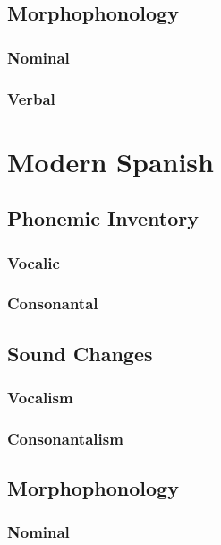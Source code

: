\documentclass{report}
\begin{document}
\section{Morphophonology}

\subsection{Nominal}

\subsection{Verbal}

\chapter{Modern Spanish}


\section{Phonemic Inventory}

\subsection{Vocalic}

\subsection{Consonantal}

\section{Sound Changes}

\subsection{Vocalism}

\subsection{Consonantalism}

\section{Morphophonology}

\subsection{Nominal}
\end{document}

